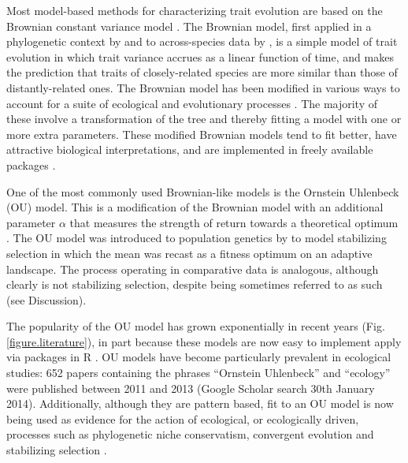 \documentclass[a4paper,12pt]{article}
\begin{document}
  Most model-based methods for characterizing trait evolution are based on the Brownian constant variance model \citep[for exceptions see][]{price1997correlated,harvey2000comparative,freckleton2006detecting}. 
  The Brownian model, first applied in a phylogenetic context by \citet{cavalli1967} and to across-species data by \citet{felsenstein1973maximum}, is a simple model of trait evolution in which trait variance accrues as a linear function of time, and makes the prediction that traits of closely-related species are more similar than those of distantly-related ones. 
  The Brownian model has been modified in various ways to account for a suite of ecological and evolutionary processes \citep[e.g.,][]{grafen1989phylogenetic,hansen1997stabilizing,Pagel:1997aa,Pagel:1999aa}. 
  The majority of these involve a transformation of the tree and thereby fitting a model with one or more extra parameters. 
  These modified Brownian models tend to fit better, have attractive biological interpretations, and are implemented in freely available packages \citep[e.g., R;][]{R-Core-Team:2014aa}. 

  One of the most commonly used Brownian-like models is the Ornstein Uhlenbeck (OU) model. 
  This is a modification of the Brownian model with an additional parameter $\alpha$ that measures the strength of return towards a theoretical optimum \citep{hansen1997stabilizing}. 
  The OU model was introduced to population genetics by \cite{Lande:1976aa} to model stabilizing selection in which the mean was recast as a fitness optimum on an adaptive landscape. 
  The process operating in comparative data is analogous, although clearly is not stabilizing selection, despite being sometimes referred to as such (see Discussion).

  The popularity of the OU model has grown exponentially in recent years (Fig. \ref{figure.literature}), in part because these models are now easy to implement apply via packages in R \citep[e.g. ouch, GEIGER and OUwie;][]{Butler:2004aa,Harmon:2008aa,beaulieu2012ouwie}. OU models have become particularly prevalent in ecological studies: 652 papers containing the phrases “Ornstein Uhlenbeck” and “ecology” were published between 2011 and 2013 (Google Scholar search 30th January 2014). Additionally, although they are pattern based, fit to an OU model is now being used as evidence for the action of ecological, or ecologically driven, processes such as phylogenetic niche conservatism, convergent evolution and stabilizing selection \citep[e.g.,][]{Wiens:2010aa,christin2013anatomical,ingram2013surface}.
 
\end{document}
